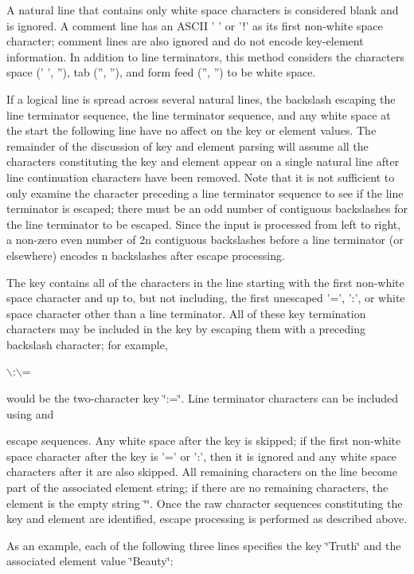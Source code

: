 A natural line that contains only white space characters is considered blank and is ignored. A comment line has an ASCII ' ' or '!' as its first non-white space character; comment lines are also ignored and do not encode key-element information. In addition to line terminators, this method considers the characters space (' ', ''), tab ('', ''), and form feed ('', '') to be white space.

If a logical line is spread across several natural lines, the backslash escaping the line terminator sequence, the line terminator sequence, and any white space at the start the following line have no affect on the key or element values. The remainder of the discussion of key and element parsing will assume all the characters constituting the key and element appear on a single natural line after line continuation characters have been removed. Note that it is not sufficient to only examine the character preceding a line terminator sequence to see if the line terminator is escaped; there must be an odd number of contiguous backslashes for the line terminator to be escaped. Since the input is processed from left to right, a non-zero even number of 2n contiguous backslashes before a line terminator (or elsewhere) encodes n backslashes after escape processing.

The key contains all of the characters in the line starting with the first non-white space character and up to, but not including, the first unescaped '=', ':', or white space character other than a line terminator. All of these key termination characters may be included in the key by escaping them with a preceding backslash character; for example,

$\backslash$:$\backslash$=

would be the two-character key \char`\"{}:=\char`\"{}. Line terminator characters can be included using  and \par
 escape sequences. Any white space after the key is skipped; if the first non-white space character after the key is '=' or ':', then it is ignored and any white space characters after it are also skipped. All remaining characters on the line become part of the associated element string; if there are no remaining characters, the element is the empty string \char`\"{}\char`\"{}. Once the raw character sequences constituting the key and element are identified, escape processing is performed as described above.

As an example, each of the following three lines specifies the key \char`\"{}Truth\char`\"{} and the associated element value \char`\"{}Beauty\char`\"{}:

